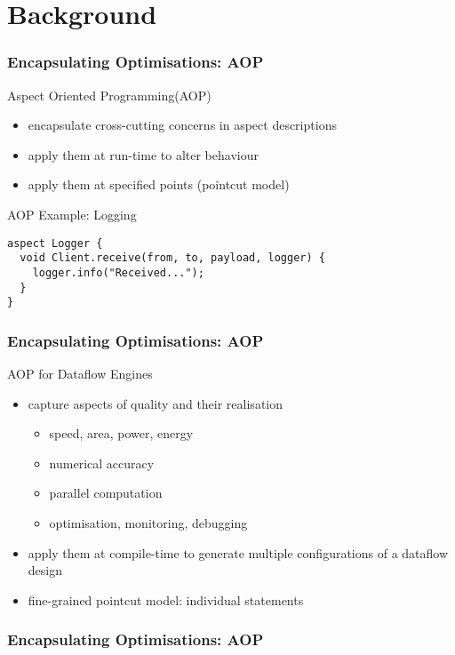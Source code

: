 \section{Background}

\begin{frame}[fragile]
  \frametitle{Encapsulating Optimisations: AOP}
  \begin{beamerboxesrounded}{Aspect Oriented Programming(AOP)}
    \begin{itemize}
      \item encapsulate cross-cutting concerns in aspect descriptions
      \item apply them at run-time to alter behaviour
      \item apply them at specified points (pointcut model)
    \end{itemize}
  \end{beamerboxesrounded}
\vspace{0.75cm}
\begin{beamerboxesrounded}{AOP Example: Logging}
\vspace{-0.5cm}
  \begin{lstlisting}[label=lst:label]
aspect Logger {
  void Client.receive(from, to, payload, logger) {
    logger.info("Received...");
  }
}
\end{lstlisting}
\end{beamerboxesrounded}


\end{frame}

\begin{frame}[fragile]
  \frametitle{Encapsulating Optimisations: AOP}
  \begin{beamerboxesrounded}{AOP for Dataflow Engines}
    \begin{itemize}
      \item capture aspects of quality and their realisation
        \begin{itemize}
          \item speed, area, power, energy
          \item numerical accuracy
          \item parallel computation
          \item optimisation, monitoring, debugging
        \end{itemize}
      \item apply them at compile-time to generate multiple
        configurations of a dataflow design
      \item fine-grained pointcut model: individual statements
    \end{itemize}
  \end{beamerboxesrounded}
\end{frame}

\begin{frame}[fragile]
  \frametitle{Encapsulating Optimisations: AOP}
  \begin{figure}[!ht]
  \centering
  \def\svgwidth{\textwidth}
  
\end{figure}
\end{frame}
